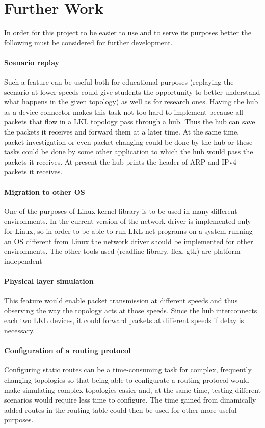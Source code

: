 \chapter{Further Work}
\label{chapter:further}
In order for this project to be easier to use and to serve its purposes better the following must be considered for further development.

\subsubsection{Scenario replay}
\label{sec:scenario-replay}
Such a feature can be useful both for educational purposes (replaying the scenario at lower speeds could give students the opportunity to better understand what happens in the given topology) as well as for research ones. Having the hub as a device connector makes this task not too hard to implement because all packets that flow in a LKL topology pass through a hub. Thus the hub can save the packets it receives and forward them at a later time. At the same time, packet investigation or even packet changing could be done by the hub or these tasks could be done by some other application to which the hub would pass the packets it receives. At present the hub prints the header of ARP and IPv4 packets it receives.

\subsubsection{Migration to other OS}
\label{sec:migration-os}
One of the purposes of Linux kernel library is to be used in many different environments. In the current version of \project the network driver is implemented only for Linux, so in order to be able to run LKL-net programs on a system running an OS different from Linux the network driver should be implemented for other enviromnents.
The other tools used (readline library, flex, gtk) are platform independent

\subsubsection{Physical layer simulation}
\label{sec:physica-sim}
This feature would enable packet transmission at different speeds and thus observing the way the topology acts at those speeds. Since the hub interconnects each two LKL devices, it could forward packets at different speeds if delay is necessary. 

\subsubsection{Configuration of a routing protocol}
\label{sec:routing-prot}
Configuring static routes can be a time-consuming task for complex, frequently changing topologies so that being able to configurate a routing protocol would make simulating complex topologies easier and, at the same time, testing different scenarios would require less time to configure. The time gained from dinamically added routes in the routing table could then be used for other more useful purposes.

